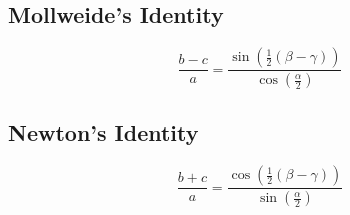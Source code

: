 \documentclass{article}
\begin{document}
\subsection{Mollweide's Identity}
\begin{equation}
	\frac{b-c}{a}=\frac{\sin{\left( \frac{1}{2}\left( \beta-\gamma \right) \right)}}{\cos{\left( \frac{\alpha}{2} \right)}}
\end{equation}
\subsection{Newton's Identity}
\begin{equation}
	\frac{b+c}{a}=\frac{\cos{\left( \frac{1}{2}\left( \beta-\gamma \right) \right)}}{\sin{\left( \frac{\alpha}{2} \right)}}
\end{equation}
\end{document}
